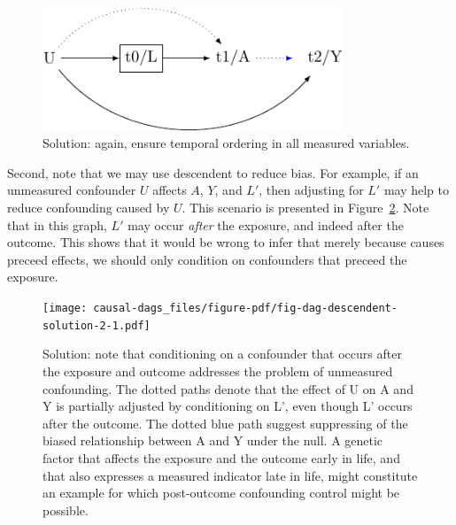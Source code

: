 \documentclass[
  singlecolumn]{report}
\begin{document}
\begin{figure}

{\centering \includegraphics[width=0.8\textwidth,height=\textheight]{causal-dags_files/figure-pdf/fig-dag-descendent-solution-1.pdf}

}

\caption{\label{fig-dag-descendent-solution}Solution: again, ensure
temporal ordering in all measured variables.}

\end{figure}

Second, note that we may use descendent to reduce bias. For example, if
an unmeasured confounder \(U\) affects \(A\), \(Y\), and \(L\prime\),
then adjusting for \(L\prime\) may help to reduce confounding caused by
\(U\). This scenario is presented in
Figure~\ref{fig-dag-descendent-solution-2}. Note that in this graph,
\(L\prime\) may occur \emph{after} the exposure, and indeed after the
outcome. This shows that it would be wrong to infer that merely because
causes preceed effects, we should only condition on confounders that
preceed the exposure.

\begin{figure}

{\centering \texttt{[image: causal-dags\_files/figure-pdf/fig-dag-descendent-solution-2-1.pdf]}

}

\caption{\label{fig-dag-descendent-solution-2}Solution: note that
conditioning on a confounder that occurs after the exposure and outcome
addresses the problem of unmeasured confounding. The dotted paths denote
that the effect of U on A and Y is partially adjusted by conditioning on
L', even though L' occurs after the outcome. The dotted blue path
suggest suppressing of the biased relationship between A and Y under the
null. A genetic factor that affects the exposure and the outcome early
in life, and that also expresses a measured indicator late in life,
might constitute an example for which post-outcome confounding control
might be possible.}

\end{figure}
\end{document}
